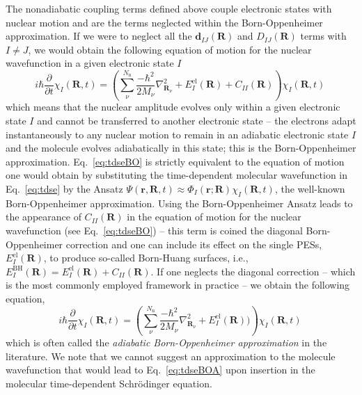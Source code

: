 \documentclass[9pt,bestpractices,pubversion]{livecoms}
\begin{document}
The nonadiabatic coupling terms defined above couple electronic states with nuclear motion and are the terms neglected within the Born-Oppenheimer approximation. If we were to neglect all the $\mathbf{d}_{IJ}(\mathbf{R})$ and  $D_{IJ}(\mathbf{R})$ terms with $I \neq J$, we would obtain the following equation of motion for the nuclear wavefunction in a given electronic state $I$  
\begin{equation}
i\hbar\frac{\partial}{\partial t} \chi_I(\mathbf{R},t)  = \left(\sum_\nu^{N_{\text{n}}}\frac{-\hbar^2}{2M_\nu} \nabla_{\mathbf{R}_\nu}^2 + E^{\text{el}}_{I}(\mathbf{R}) + C_{II}(\mathbf{R}) \right) \chi_I(\mathbf{R},t) \, 
\label{eq:tdseBO}
\end{equation}
which means that the nuclear amplitude evolves only within a given electronic state $I$ and cannot be transferred to another electronic state -- the electrons adapt instantaneously to any nuclear motion to remain in an adiabatic electronic state $I$ and the molecule evolves adiabatically in this state; this is the Born-Oppenheimer approximation. Eq.~\eqref{eq:tdseBO} is strictly equivalent to the equation of motion one would obtain by substituting the time-dependent molecular wavefunction in Eq.~\eqref{eq:tdse} by the Ansatz $\Psi(\mathbf{r},\mathbf{R},t) \approx \Phi_I(\mathbf{r};\mathbf{R})\chi_I(\mathbf{R},t)$, the well-known Born-Oppenheimer approximation. Using the Born-Oppenheimer Ansatz leads to the appearance of  $C_{II}(\mathbf{R})$ in the equation of motion for the nuclear wavefunction (see Eq.~\eqref{eq:tdseBO}) -- this term is coined the diagonal Born-Oppenheimer correction and one can include its effect on the single PESs, $E^{\text{el}}_{I}(\mathbf{R})$, to produce so-called Born-Huang surfaces, i.e., $E^{\text{BH}}_{I}(\mathbf{R}) = E^{\text{el}}_{I}(\mathbf{R}) + C_{II}(\mathbf{R})$.\cite{Levine_JCP2016,hush2017cusp,ibele2021diabolical} If one neglects the diagonal correction -- which is the most commonly employed framework in practice -- we obtain the following equation, 
\begin{equation}
i\hbar\frac{\partial}{\partial t} \chi_I(\mathbf{R},t)  = \left(\sum_\nu^{N_{\text{n}}}\frac{-\hbar^2}{2M_\nu} \nabla_{\mathbf{R}_\nu}^2 + E^{\text{el}}_{I}(\mathbf{R}) ) \right) \chi_I(\mathbf{R},t) \, 
\label{eq:tdseBOA}
\end{equation}
which is often called the \textit{adiabatic Born-Oppenheimer approximation} in the literature.\cite{worth2004beyond} We note that we cannot suggest an approximation to the molecule wavefunction that would lead to Eq.~\eqref{eq:tdseBOA} upon insertion in the molecular time-dependent Schr\"{o}dinger equation.
\end{document}
